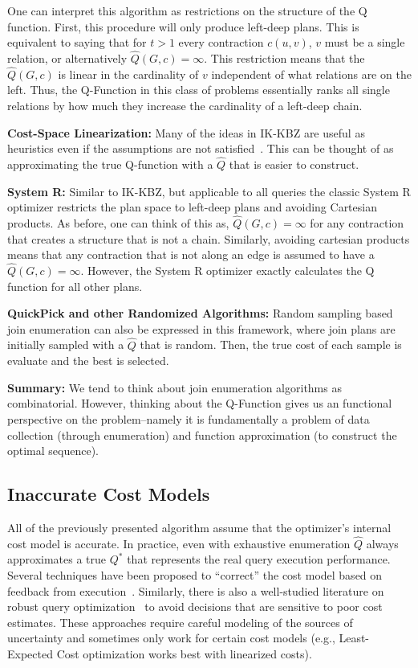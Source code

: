 One can interpret this algorithm as restrictions on the structure of the Q function. First, this procedure will only produce left-deep plans. This is equivalent to saying that for $t>1$ every contraction $c(u,v)$, $v$ must be a single relation, or alternatively $\hat{Q}(G,c) = \infty$. This restriction means that the $\hat{Q}(G,c)$ is linear in the cardinality of $v$ independent of what relations are on the left. Thus, the Q-Function in this class of problems essentially ranks all single relations by how much they increase the cardinality of a left-deep chain. 

\vspace{0.25em} \noindent \textbf{Cost-Space Linearization: } Many of the ideas in IK-KBZ are useful as heuristics even if the assumptions are not satisfied~\cite{?}. This can be thought of as approximating the true Q-function with a $\hat{Q}$ that is easier to construct.

\vspace{0.25em} \noindent \textbf{System R: } Similar to IK-KBZ, but applicable to all queries the classic System R optimizer restricts the plan space to left-deep plans and avoiding Cartesian products. As before, one can think of this as, $\hat{Q}(G, c) = \infty$ for any contraction that creates a structure that is not a chain. Similarly, avoiding cartesian products means that any contraction that is not along an edge is assumed to have a $\hat{Q}(G,c) = \infty$. However, the System R optimizer exactly calculates the Q function for all other plans.

\vspace{0.25em} \noindent \textbf{QuickPick and other Randomized Algorithms: } Random sampling based join enumeration can also be expressed in this framework, where join plans are initially sampled with a $\hat{Q}$ that is random. Then, the true cost of each sample is evaluate and the best is selected. 

\vspace{0.25em} \noindent \textbf{Summary: } We tend to think about join enumeration algorithms as combinatorial. However, thinking about the Q-Function gives us an functional perspective on the problem--namely it is fundamentally a problem of data collection (through enumeration) and function approximation (to construct the optimal sequence).  

\subsection{Inaccurate Cost Models}
All of the previously presented algorithm assume that the optimizer's internal cost model is accurate. In practice, even with exhaustive enumeration $\hat{Q}$ always approximates a true $Q^*$ that represents the real query execution performance. Several techniques have been proposed to ``correct'' the cost model based on feedback from execution~\cite{?}. Similarly, there is also a well-studied literature on robust query optimization~\cite{?} to avoid decisions that are sensitive to poor cost estimates. These approaches require careful modeling of the sources of uncertainty and sometimes only work for certain cost models (e.g., Least-Expected Cost optimization works best with linearized costs). 


